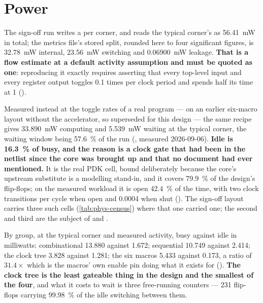 \section{Power}

The sign-off run writes a  per corner, and
 reads the typical corner's as
\qty{56.41}{\milli\watt} in total; the metrics file's stored split,
rounded here to four significant figures, is \qty{32.78}{\milli\watt}
internal, \qty{23.56}{\milli\watt} switching and
\qty{0.06900}{\milli\watt} leakage. \textbf{That is a flow estimate at a
default activity assumption and must be quoted as one}: reproducing it
exactly requires asserting that every top-level input and every register
output toggles 0.1 times per clock period and spends half its time at 1
().

Measured instead at the toggle rates of a real program --- on an earlier
six-macro layout without the accelerator, so superseded for this design
--- the same recipe gives \qty{33.890}{\milli\watt} computing and
\qty{5.539}{\milli\watt} waiting at the typical corner, the waiting
window being \qty{57.6}{\percent} of the run (,
measured 2026-09-06). \textbf{Idle is \qty{16.3}{\percent} of busy, and
the reason is a clock gate that had been in the netlist since the core
was brought up and that no document had ever mentioned.} It is the real
PDK cell, bound deliberately because the core's upstream substitute is a
modelling stand-in, and it covers \qty{79.9}{\percent} of the design's
flip-flops; on the measured workload it is open \qty{42.4}{\percent} of
the time, with two clock transitions per cycle when open and 0.0004 when
shut (). The sign-off layout carries three such
cells (\cref{tab:phys-census}) where that one carried one; the second
and third are the subject of  and .

By group, at the typical corner and measured activity, busy against idle
in milliwatts: combinational \num{13.880} against \num{1.672};
sequential \num{10.749} against \num{2.414}; the clock tree \num{3.828}
against \num{1.281}; the six macros \num{5.433} against \num{0.173}, a
ratio of $31.4\times$ which is the macros' own enable pin doing what it
exists for (). \textbf{The clock tree is the
least gateable thing in the design and the smallest of the four}, and
what it costs to wait is three free-running counters --- 231 flip-flops
carrying \qty{99.98}{\percent} of the idle switching between them.

